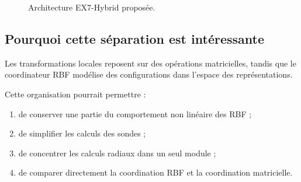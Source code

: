 \documentclass[11pt,a4paper]{article}
\begin{document}
\begin{figure}[H]
\centering
{}
\caption{Architecture EX7-Hybrid proposée.}
\end{figure}

\subsection{Pourquoi cette séparation est intéressante}

Les transformations locales reposent sur des opérations
matricielles, tandis que le coordinateur RBF modélise
des configurations dans l'espace des représentations.

Cette organisation pourrait permettre :

\begin{enumerate}
  \item de conserver une partie du comportement non linéaire
  des RBF ;
  \item de simplifier les calculs des sondes ;
  \item de concentrer les calculs radiaux dans un seul module ;
  \item de comparer directement la coordination RBF
  et la coordination matricielle.
\end{enumerate}
\end{document}
